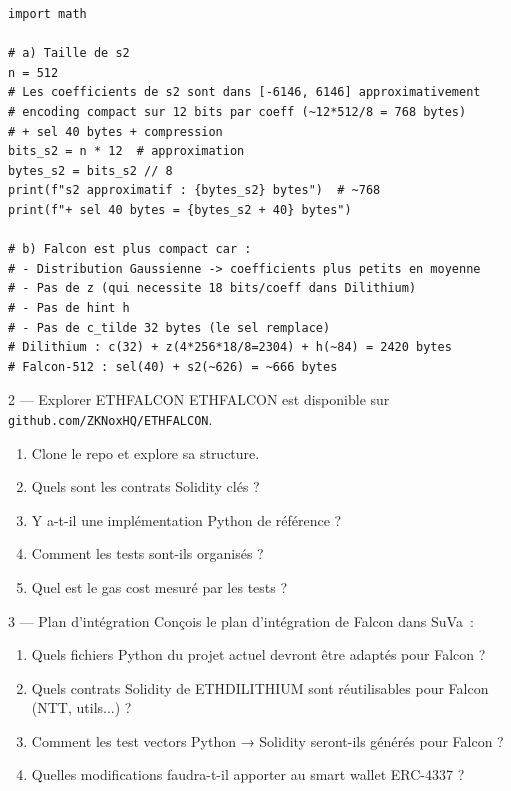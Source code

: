\documentclass[12pt, a4paper]{article}
\begin{document}
\begin{solution}
\begin{lstlisting}[style=python]
import math

# a) Taille de s2
n = 512
# Les coefficients de s2 sont dans [-6146, 6146] approximativement
# encoding compact sur 12 bits par coeff (~12*512/8 = 768 bytes)
# + sel 40 bytes + compression
bits_s2 = n * 12  # approximation
bytes_s2 = bits_s2 // 8
print(f"s2 approximatif : {bytes_s2} bytes")  # ~768
print(f"+ sel 40 bytes = {bytes_s2 + 40} bytes")

# b) Falcon est plus compact car :
# - Distribution Gaussienne -> coefficients plus petits en moyenne
# - Pas de z (qui necessite 18 bits/coeff dans Dilithium)
# - Pas de hint h
# - Pas de c_tilde 32 bytes (le sel remplace)
# Dilithium : c(32) + z(4*256*18/8=2304) + h(~84) = 2420 bytes
# Falcon-512 : sel(40) + s2(~626) = ~666 bytes
\end{lstlisting}
\end{solution}

\begin{exercice}{2 --- Explorer ETHFALCON}
ETHFALCON est disponible sur \texttt{github.com/ZKNoxHQ/ETHFALCON}.
\begin{enumerate}[label=\alph*)]
  \item Clone le repo et explore sa structure.
  \item Quels sont les contrats Solidity clés ?
  \item Y a-t-il une implémentation Python de référence ?
  \item Comment les tests sont-ils organisés ?
  \item Quel est le gas cost mesuré par les tests ?
\end{enumerate}
\end{exercice}

\begin{exercice}{3 --- Plan d'intégration}
Conçois le plan d'intégration de Falcon dans SuVa~:
\begin{enumerate}[label=\alph*)]
  \item Quels fichiers Python du projet actuel devront être adaptés
        pour Falcon ?
  \item Quels contrats Solidity de ETHDILITHIUM sont réutilisables pour
        Falcon (NTT, utils...) ?
  \item Comment les test vectors Python → Solidity seront-ils générés
        pour Falcon ?
  \item Quelles modifications faudra-t-il apporter au smart wallet
        ERC-4337 ?
\end{enumerate}
\end{exercice}
\end{document}
